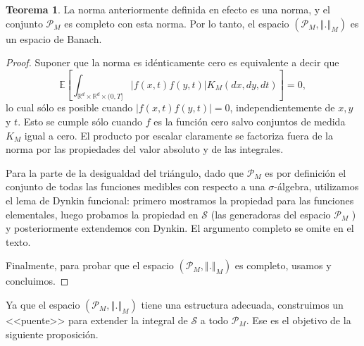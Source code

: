 \documentclass[letterpaper,twoside,12pt]{book}
\newcommand{\R}{\mathbb{R}}
\newcommand{\E}{\mathbb{E}}
\newcommand{\1}{\mathds{1}}
\newcommand{\abs}[1]{\left\lvert #1 \right\rvert}
\newcommand{\norm}[1]{\left\Vert #1 \right\Vert}
\theoremstyle{definition}
\theoremstyle{definition}
\newtheorem{teo}{Teorema}
\theoremstyle{remark}
\theoremstyle{definition}
\theoremstyle{definition}
\theoremstyle{definition}
\theoremstyle{definition}
\theoremstyle{definition}
\begin{document}
\begin{teo} 
La norma anteriormente definida en efecto es una norma, y el conjunto $\mathscr{P}_M$ es completo con esta norma. Por lo tanto, el espacio $(\mathscr{P}_M,\norm{.}_M)$ es un espacio de Banach.
\end{teo}
\begin{proof} 
  Suponer que la norma es idénticamente cero es equivalente a decir que 
  \[
   \E\left[\int_{\R^{d}\times\R^{d}\times (0,T]} \abs{f(x,t)f(y,t)}K_M(dx, dy, dt)\right]=0,
  \]
  lo cual sólo es posible cuando $\abs{f(x,t)f(y,t)}=0$, independientemente de $x,y$ y $t$. Esto se cumple sólo cuando $f$ es la función cero salvo conjuntos de medida $K_M$ igual a cero. El producto por escalar claramente se factoriza fuera de la norma por las propiedades del valor absoluto y de las integrales.
  
  Para la parte de la desigualdad del triángulo, dado que $\mathscr{P}_M$ es por definición el conjunto de todas las funciones medibles con respecto a una $\sigma$-álgebra, utilizamos el lema de Dynkin funcional: primero mostramos la propiedad para las funciones elementales, luego probamos la propiedad en $\mathscr{S}$ (las generadoras del espacio $\mathscr{P}_M$ ) y posteriormente extendemos con Dynkin. El argumento completo se omite en el texto.

  Finalmente, para probar que el espacio $(\mathscr{P}_M,\norm{.}_M)$ es completo, usamos \cite[proposición 2.2]{Walsh_J.B_Introduction_to_SPDEs} y concluimos.
 \end{proof}

Ya que el espacio $(\mathscr{P}_M,\norm{.}_M)$ tiene una estructura adecuada, construimos un <<puente>> para extender la integral de $\mathscr{S}$ a todo $\mathscr{P}_M$. Ese es el objetivo de la siguiente proposición. 
\end{document}
